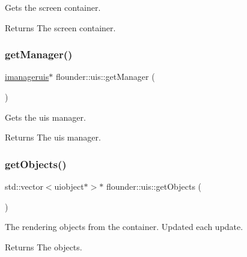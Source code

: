 Gets the screen container. 

\begin{DoxyReturn}{Returns}
The screen container. 
\end{DoxyReturn}
\mbox{\label{classflounder_1_1uis_a0f6b2bd57647e10aaf348465c9b0cf6e}} 
\subsubsection{\texorpdfstring{get\+Manager()}{getManager()}}
{\footnotesize\ttfamily \hyperlink{classflounder_1_1imanageruis}{imanageruis}$\ast$ flounder\+::uis\+::get\+Manager (\begin{DoxyParamCaption}{ }\end{DoxyParamCaption})\hspace{0.3cm}{\ttfamily [inline]}}



Gets the uis manager. 

\begin{DoxyReturn}{Returns}
The uis manager. 
\end{DoxyReturn}
\mbox{\label{classflounder_1_1uis_af2c2a4e585933105ed3ce193212974ae}} 
\subsubsection{\texorpdfstring{get\+Objects()}{getObjects()}}
{\footnotesize\ttfamily std\+::vector$<$uiobject$\ast$$>$$\ast$ flounder\+::uis\+::get\+Objects (\begin{DoxyParamCaption}{ }\end{DoxyParamCaption})\hspace{0.3cm}{\ttfamily [inline]}}



The rendering objects from the container. Updated each update. 

\begin{DoxyReturn}{Returns}
The objects. 
\end{DoxyReturn}
\mbox{\label{classflounder_1_1uis_ae6d263255b82ee6358afe91cc55ca889}} 
